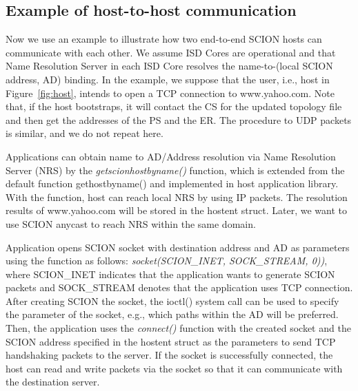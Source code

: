 
\subsection{Example of host-to-host communication}

Now we use an example to illustrate how two end-to-end SCION hosts
can communicate with each other. We assume ISD Cores are operational
and that Name Resolution Server in each ISD Core resolves the
name-to-(local SCION address, AD) binding. In the example, we
suppose that the user, i.e., host in Figure~\ref{fig:host}, intends
to open a TCP connection to www.yahoo.com. Note that, if the host
bootstraps, it will contact the CS for the updated topology file and
then get the addresses of the PS and the ER. The procedure to  UDP
packets is similar, and we do not repeat here.

Applications can obtain name to AD/Address resolution via Name
Resolution Server (NRS) by the {\em getscionhostbyname()} function,
which is extended from the default function gethostbyname() and
implemented in host application library. With the function, host can
reach local NRS by using IP packets. The resolution results of
www.yahoo.com will be stored in the hostent struct. Later, we want
to use SCION anycast to reach NRS within the same domain.

Application opens SCION socket with destination address and AD as
parameters using the function as follows: {\em socket(SCION\_INET,
SOCK\_STREAM, 0))}, where SCION\_INET indicates that the application
wants to generate SCION packets and SOCK\_STREAM denotes that the
application uses TCP connection. After creating SCION the socket,
the ioctl() system call can be used to specify the parameter of the
socket, e.g., which paths within the AD will be preferred. Then, the
application uses the {\em connect()} function with the created
socket and the SCION address specified in the hostent struct as the
parameters to send TCP handshaking packets to the server. If the
socket is successfully connected, the host can read and write
packets via the socket so that it can communicate with the
destination server.

